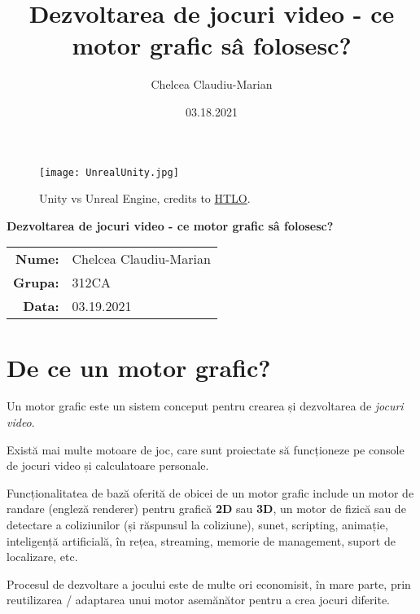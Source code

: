 \documentclass[12pt]{article}
\author{Chelcea Claudiu-Marian}
\title{Dezvoltarea de jocuri video - ce motor grafic s\^{a} folosesc?}
\date{03.18.2021}
\begin{document}
\begin{titlepage}
  \afterpage{\pagecolor{white}}%
  \LARGE
  \begin{center}
  \begin{figure}
  \texttt{[image: UnrealUnity.jpg]}
  \caption{Unity vs Unreal Engine,  credits to \href{https://www.htlo.co.uk/unity-vs-unreal-engine-a-quick-comparison/}{HTLO}.}
  \label{fig:UvsUE}

\end{figure}

    {\bfseries Dezvoltarea de jocuri video - ce motor grafic s\^{a} folosesc?}\\[3em]
    {\large
      \begin{tabular}{rl}
      \textbf{Nume:} & Chelcea Claudiu-Marian \\
      \textbf{Grupa:} & 312CA \\
 	\textbf{Data:} & 03.19.2021
      \end{tabular}%
    }
  \end{center}
\end{titlepage}

\newpage
\tableofcontents

\newpage
\section{De ce un motor grafic?}
\hspace{10pt}
Un motor grafic este un sistem conceput pentru crearea și dezvoltarea de {\it jocuri video}. \par Există mai multe motoare de joc, care sunt proiectate să funcționeze pe console de jocuri video și calculatoare personale. \par Funcționalitatea de bază oferită de obicei de un motor grafic include un motor de randare (engleză renderer) pentru grafică {\bf 2D} sau {\bf 3D}, un motor de fizică sau de detectare a coliziunilor (și răspunsul la coliziune), sunet, scripting, animație, inteligență artificială, în rețea, streaming, memorie de management, suport de localizare, etc. \par Procesul de dezvoltare a jocului este de multe ori economisit, în mare parte, prin reutilizarea / adaptarea unui motor asemănător pentru a crea jocuri diferite.

\newpage
\end{document}
